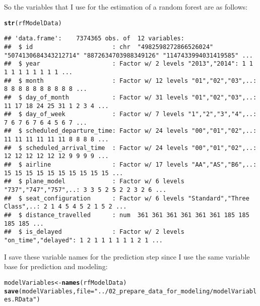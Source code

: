 \documentclass{article}\usepackage[]{graphicx}\usepackage[]{color}
\makeatletter
\newcommand{\hlstr}[1]{\textcolor[rgb]{0.192,0.494,0.8}{#1}}%
\newcommand{\hlstd}[1]{\textcolor[rgb]{0.345,0.345,0.345}{#1}}%
\newcommand{\hlkwb}[1]{\textcolor[rgb]{0.69,0.353,0.396}{#1}}%
\newcommand{\hlkwc}[1]{\textcolor[rgb]{0.333,0.667,0.333}{#1}}%
\newcommand{\hlkwd}[1]{\textcolor[rgb]{0.737,0.353,0.396}{\textbf{#1}}}%
\newenvironment{kframe}{%
 \def\at@end@of@kframe{}%
 \ifinner\ifhmode%
  \def\at@end@of@kframe{\end{minipage}}%
  \begin{minipage}{\columnwidth}%
 \fi\fi%
 \def\FrameCommand##1{\hskip\@totalleftmargin \hskip-\fboxsep
 \colorbox{shadecolor}{##1}\hskip-\fboxsep
     \hskip-\linewidth \hskip-\@totalleftmargin \hskip\columnwidth}%
 \MakeFramed {\advance\hsize-\width
   \@totalleftmargin\z@ \linewidth\hsize
   \@setminipage}}%
 {\par\unskip\endMakeFramed%
 \at@end@of@kframe}
\newenvironment{knitrout}{}{} %
\makeatother
\begin{document}
So the variables that I use for the estimation of a random forest are as follows:
\begin{knitrout}
\color{fgcolor}\begin{kframe}
\begin{alltt}
\hlkwd{str}\hlstd{(rfModelData)}
\end{alltt}
\begin{verbatim}
## 'data.frame':	7374365 obs. of  12 variables:
##  $ id                      : chr  "4982598272866526024" "5074130684343212714" "8872634703988349126" "1147433994031419585" ...
##  $ year                    : Factor w/ 2 levels "2013","2014": 1 1 1 1 1 1 1 1 1 1 ...
##  $ month                   : Factor w/ 12 levels "01","02","03",..: 8 8 8 8 8 8 8 8 8 8 ...
##  $ day_of_month            : Factor w/ 31 levels "01","02","03",..: 11 17 18 24 25 31 1 2 3 4 ...
##  $ day_of_week             : Factor w/ 7 levels "1","2","3","4",..: 7 6 7 6 7 6 4 5 6 7 ...
##  $ scheduled_departure_time: Factor w/ 24 levels "00","01","02",..: 11 11 11 11 11 11 8 8 8 8 ...
##  $ scheduled_arrival_time  : Factor w/ 24 levels "00","01","02",..: 12 12 12 12 12 12 9 9 9 9 ...
##  $ airline                 : Factor w/ 17 levels "AA","AS","B6",..: 15 15 15 15 15 15 15 15 15 15 ...
##  $ plane_model             : Factor w/ 6 levels "737","747","757",..: 3 3 5 2 5 2 2 3 2 6 ...
##  $ seat_configuration      : Factor w/ 6 levels "Standard","Three Class",..: 2 1 4 5 4 5 2 1 5 2 ...
##  $ distance_travelled      : num  361 361 361 361 361 361 185 185 185 185 ...
##  $ is_delayed              : Factor w/ 2 levels "on_time","delayed": 1 2 1 1 1 1 1 1 2 1 ...
\end{verbatim}
\end{kframe}
\end{knitrout}

I save these variable names for the prediction step since I use the same variable base for prediction and modeling:
\begin{knitrout}
\color{fgcolor}\begin{kframe}
\begin{alltt}
\hlstd{modelVariables} \hlkwb{<-} \hlkwd{names}\hlstd{(rfModelData)}
\hlkwd{save}\hlstd{(modelVariables,} \hlkwc{file}\hlstd{=}\hlstr{"../02_prepare_data_for_modeling/modelVariables.RData"}\hlstd{)}
\end{alltt}
\end{kframe}
\end{knitrout}
\end{document}
